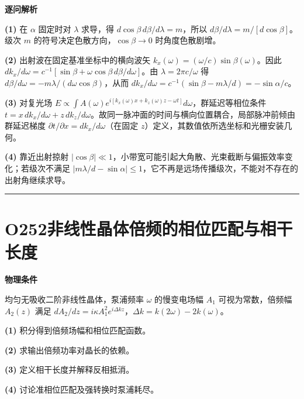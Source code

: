 \documentclass[UTF8,a4paper,11pt,oneside,openany]{ctexbook}
\begin{document}
\par\medskip\noindent\textbf{逐问解析}
\par\noindent\textbf{(1)} 在 \(\alpha\) 固定时对 \(\lambda\) 求导，得 \(d\cos\beta\,d\beta/d\lambda=m\)，所以 \(d\beta/d\lambda=m/[d\cos\beta]\)。级次 \(m\) 的符号决定色散方向，\(\cos\beta\to0\) 时角度色散剧增。
\par\noindent\textbf{(2)} 出射波在固定基准坐标中的横向波矢 \(k_x(\omega)=(\omega/c)\sin\beta(\omega)\)。因此 \(dk_x/d\omega=c^{-1}[\sin\beta+\omega\cos\beta\,d\beta/d\omega]\)。由 \(\lambda=2\pi c/\omega\) 得 \(d\beta/d\omega=-m\lambda/(d\omega\cos\beta)\)，从而 \(dk_x/d\omega=c^{-1}(\sin\beta-m\lambda/d)=-\sin\alpha/c\)。
\par\noindent\textbf{(3)} 对复光场 \(E\propto\int A(\omega)e^{i[k_x(\omega)x+k_z(\omega)z-\omega t]}d\omega\)，群延迟等相位条件 \(t=x\,dk_x/d\omega+z\,dk_z/d\omega\)。故同一脉冲面的时间与横向位置耦合，局部脉冲前倾由群延迟梯度 \(\partial t/\partial x=dk_x/d\omega\)（在固定 \(z\)）定义，其数值依所选坐标和光栅安装几何。
\par\noindent\textbf{(4)} 靠近出射掠射 \(|\cos\beta|\ll1\)，小带宽可能引起大角散、光束截断与偏振效率变化；若级次不满足 \(|m\lambda/d-\sin\alpha|\le1\)，它不再是远场传播级次，不能对不存在的出射角继续求导。

\par\bigskip\hrule\bigskip
\section*{O252\quad 非线性晶体倍频的相位匹配与相干长度}
\textbf{物理条件}\par 均匀无吸收二阶非线性晶体，泵浦频率 \(\omega\) 的慢变电场幅 \(A_1\) 可视为常数，倍频幅 \(A_2(z)\) 满足 \(dA_2/dz=i\kappa A_1^2 e^{i\Delta k z}\)，\(\Delta k=k(2\omega)-2k(\omega)\)。
\par\noindent\textbf{(1)} 积分得到倍频场幅和相位匹配函数。
\par\noindent\textbf{(2)} 求输出倍频功率对晶长的依赖。
\par\noindent\textbf{(3)} 定义相干长度并解释反相抵消。
\par\noindent\textbf{(4)} 讨论准相位匹配及强转换时泵浦耗尽。
\end{document}

